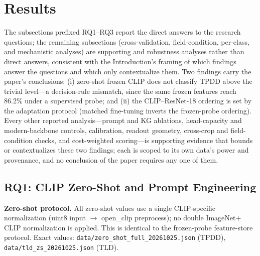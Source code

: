 \documentclass[10pt,a4paper]{article}
\begin{document}
\section{Results}
\label{sec:results}

The subsections prefixed RQ1--RQ3 report the direct answers to the research questions; the remaining subsections (cross-validation, field-condition, per-class, and mechanistic analyses) are supporting and robustness analyses rather than direct answers, consistent with the Introduction's framing of which findings answer the questions and which only contextualize them. Two findings carry the paper's conclusions: (i) zero-shot frozen CLIP does not classify TPDD above the trivial level---a decision-rule mismatch, since the same frozen features reach 86.2\% under a supervised probe; and (ii) the CLIP--ResNet-18 ordering is set by the adaptation protocol (matched fine-tuning inverts the frozen-probe ordering). Every other reported analysis---prompt and KG ablations, head-capacity and modern-backbone controls, calibration, readout geometry, cross-crop and field-condition checks, and cost-weighted scoring---is supporting evidence that bounds or contextualizes these two findings; each is scoped to its own data's power and provenance, and no conclusion of the paper requires any one of them.

\subsection{RQ1: CLIP Zero-Shot and Prompt Engineering}

\textbf{Zero-shot protocol.} All zero-shot values use a single CLIP-specific normalization (uint8 input $\to$ open\_clip preprocess); no double ImageNet$+$CLIP normalization is applied. This is identical to the frozen-probe feature-store protocol. Exact values: \texttt{data/zero\_shot\_full\_20261025.json} (TPDD), \texttt{data/tld\_zs\_20261025.json} (TLD).
\end{document}
